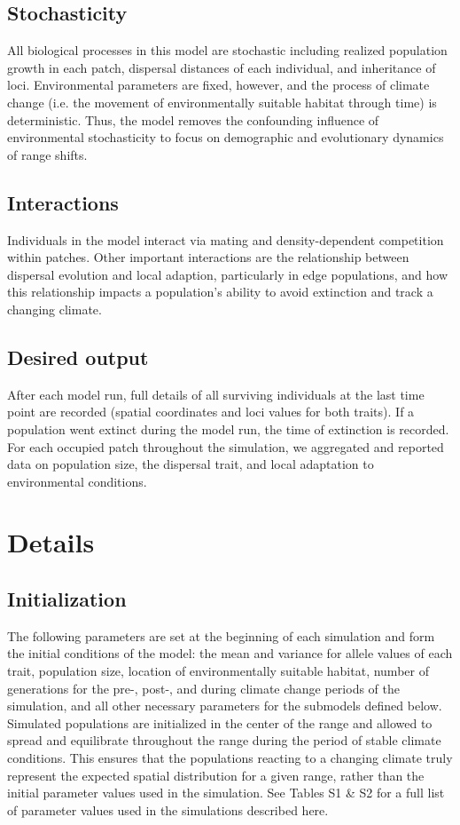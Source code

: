 \documentclass[12pt, oneside]{article}
\begin{document}
\subsection*{Stochasticity} 
All biological processes in this model are stochastic including realized population growth in each patch, dispersal distances of each individual, and inheritance of loci. Environmental parameters are fixed, however, and the process of climate change (i.e. the movement of environmentally suitable habitat through time) is deterministic. Thus, the model removes the confounding influence of environmental stochasticity to focus on demographic and evolutionary dynamics of range shifts.

\subsection*{Interactions} 
Individuals in the model interact via mating and density-dependent competition within patches. Other important interactions are the relationship between dispersal evolution and local adaption, particularly in edge populations, and how this relationship impacts a population's ability to avoid extinction and track a changing climate.

\subsection*{Desired output} 
After each model run, full details of all surviving individuals at the last time point are recorded (spatial coordinates and loci values for both traits). If a population went extinct during the model run, the time of extinction is recorded. For each occupied patch throughout the simulation, we aggregated and reported data on population size, the dispersal trait, and local adaptation to environmental conditions. 

\section*{Details}
\subsection*{Initialization} 
The following parameters are set at the beginning of each simulation and form the initial conditions of the model: the mean and variance for allele values of each trait, population size, location of environmentally suitable habitat, number of generations for the pre-, post-, and during climate change periods of the simulation, and all other necessary parameters for the submodels defined below. Simulated populations are initialized in the center of the range and allowed to spread and equilibrate throughout the range during the period of stable climate conditions. This ensures that the populations reacting to a changing climate truly represent the expected spatial distribution for a given range, rather than the initial parameter values used in the simulation. See Tables S1 \& S2 for a full list of parameter values used in the simulations described here.
\end{document}
